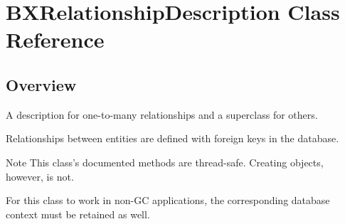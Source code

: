 \hypertarget{interface_b_x_relationship_description}{}\section{B\+X\+Relationship\+Description Class Reference}
\label{interface_b_x_relationship_description}


\subsection{Overview}
A description for one-\/to-\/many relationships and a superclass for others. 

Relationships between entities are defined with foreign keys in the database. \begin{DoxyNote}{Note}
This class's documented methods are thread-\/safe. Creating objects, however, is not. 

For this class to work in non-\/\+G\+C applications, the corresponding database context must be retained as well. 
\end{DoxyNote}
